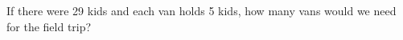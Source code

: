 \begin{prob}
If there were 29 kids and each van holds 5 kids, how many vans would
we need for the field trip?
\end{prob}









